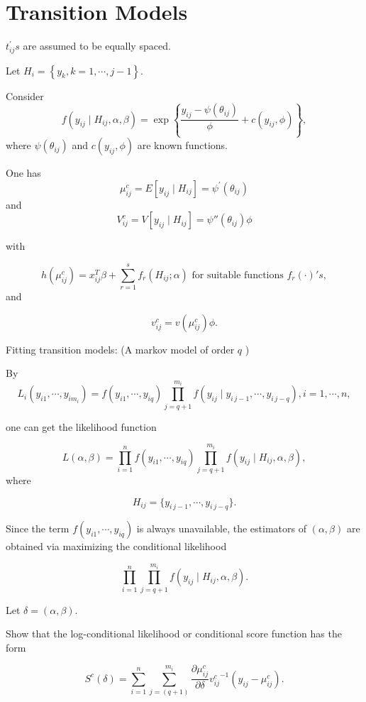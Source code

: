 \documentclass[UTF8,a4paper,10pt]{article}
\begin{document}





\section*{Transition Models}

$t_{ij}^{\prime} s$ are assumed to be equally spaced.


Let $H_i=\left\{y_k, k=1, \cdots, j-1\right\}$. 

Consider \[f(y_{ij}\mid H_{ij},\alpha,\beta) = \exp\left\{\frac{y_{ij}-\psi(\theta_{ij})}{\phi}+c(y_{ij},\phi)\right\},\] where \(\psi(\theta_{ij})\) and \(c(y_{ij},\phi)\) are known functions. 

One has 
$$\mu_{ij}^c=E\left[y_{ij} \mid H_{ij}\right]=\psi^{\prime}\left(\theta_{ij}\right)$$ 
and 
$$V_{ij}^c=V\left[y_{ij} \mid H_{ij}\right]=\psi''\left(\theta_{ij}\right) \phi$$ 

with

\[h(\mu_{ij}^c) = x_{ij}^T\beta +\sum_{r=1}^{s}f_r(H_{ij};\alpha)\text{ for suitable functions }f_r(\cdot)'s,\]
and

\[v_{ij}^c = v(\mu_{ij}^c)\phi.\]


\begin{Problem}[]{Fitting transition models: (A markov model of order $q$ )}


 

By
\[L_i(y_{i1},\cdots,y_{im_i}) = f(y_{i1},\cdots,y_{iq})\prod_{j=q+1}^{m_i}f(y_{ij}\mid y_{i\, j-1},\cdots,y_{i \, j-q}), i = 1,\cdots,n,\]

one can get the likelihood function 

\[L(\alpha,\beta) = \prod_{i=1}^{n}f(y_{i1},\cdots,y_{iq})\prod_{j=q+1}^{m_i}f(y_{ij}\mid H_{ij},\alpha,\beta),\]
where 

\[H_{ij} = \{y_{i \, j-1},\cdots,y_{i \, j-q}\}.\]

Since the term $f\left(y_{i1}, \cdots, y_{iq}\right)$ is always unavailable, the estimators of $(\alpha, \beta)$ are obtained via maximizing the conditional likelihood 

$$\prod_{i=1}^{n} \prod_{j=q+1}^{m_i} f\left(y_{ij}\mid H_{ij}, \alpha, \beta\right).$$

Let $\delta=(\alpha, \beta)$.

Show that the log-conditional likelihood or conditional score function has the form

\[S^c(\delta) = \sum_{i=1}^{n}\sum_{j = (q+1)}^{m_i}\frac{\partial \mu_{ij}^c}{\partial \delta}{v_{ij}^c}^{-1}(y_{ij}-\mu_{ij}^c).\]

\end{Problem}
\end{document}
